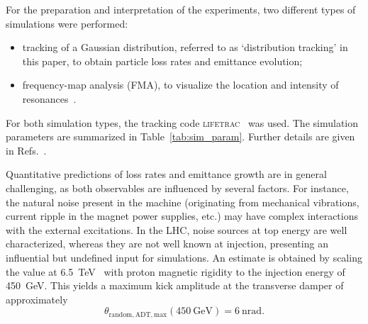 \documentclass[
prstab
,reprint
,linenumbers
,longbibliography
,preprintnumbers
,showkeys
,amsfonts,amssymb,amsmath
,floatfix
]{revtex4-1}
\newcommand{\q}[2]{\ensuremath{#1\ \mathrm{#2}}} %
\newcommand{\code}[1]{\textsc{#1}} %
\begin{document}
\begin{table}
\begin{ruledtabular}
  \end{ruledtabular}
\end{table}

For the preparation and interpretation of the experiments, two
different types of simulations were performed:
%
\begin{itemize}
\item tracking of a Gaussian distribution, referred to as
  `distribution tracking' in this paper, to obtain particle loss rates
  and emittance evolution;
\item frequency-map analysis (FMA), to visualize the location and
  intensity of resonances~\cite{fmalaskar}.
\end{itemize}
%
For both simulation types, the tracking code
\code{lifetrac}~\cite{lifetrac} was used. The simulation parameters
are summarized in Table~\ref{tab:sim_param}. Further details are given
in Refs.~\cite{md_sim_hel_res_ex_fitterer, resexmd2017}.

Quantitative predictions of loss rates and emittance growth are in
general challenging, as both observables are influenced by several
factors. For instance, the natural noise present in the machine
(originating from mechanical vibrations, current ripple in the magnet
power supplies, etc.) may have complex interactions with the external
excitations. In the LHC, noise sources at top energy are well
characterized, whereas they are not well known at injection,
presenting an influential but undefined input for simulations.  An
estimate is obtained by scaling the value at
6.5~TeV~\cite{md1433_noise_top_energy, md_noise_bbLHC} with proton
magnetic rigidity to the injection energy of 450~GeV. This yields a
maximum kick amplitude at the transverse damper of approximately
%
\begin{equation}
  \label{eq:noise-kick}
  \theta_{\mathrm{random,ADT,max}}(\mathrm{450~GeV}) = \q{6}{nrad}.
\end{equation}
\end{document}
